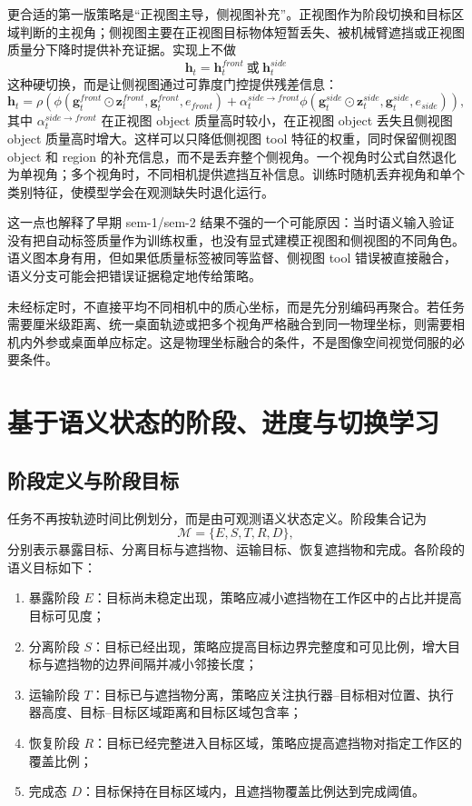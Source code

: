 \documentclass[UTF8,a4paper,11pt]{ctexart}
\begin{document}
更合适的第一版策略是“正视图主导，侧视图补充”。正视图作为阶段切换和目标区域判断的主视角；侧视图主要在正视图目标物体短暂丢失、被机械臂遮挡或正视图质量分下降时提供补充证据。实现上不做
\begin{equation}
\bm h_t=\bm h_t^{front}\ \text{或}\ \bm h_t^{side}
\end{equation}
这种硬切换，而是让侧视图通过可靠度门控提供残差信息：
\begin{equation}
\bm h_t=\rho\left(
\phi(\bm g_t^{front}\odot\bm z_t^{front},\bm g_t^{front},e_{front})
+\alpha_t^{side\rightarrow front}
\phi(\bm g_t^{side}\odot\bm z_t^{side},\bm g_t^{side},e_{side})
\right),
\end{equation}
其中 $\alpha_t^{side\rightarrow front}$ 在正视图 object 质量高时较小，在正视图 object 丢失且侧视图 object 质量高时增大。这样可以只降低侧视图 tool 特征的权重，同时保留侧视图 object 和 region 的补充信息，而不是丢弃整个侧视角。一个视角时公式自然退化为单视角；多个视角时，不同相机提供遮挡互补信息。训练时随机丢弃视角和单个类别特征，使模型学会在观测缺失时退化运行。

这一点也解释了早期 sem-1/sem-2 结果不强的一个可能原因：当时语义输入验证没有把自动标签质量作为训练权重，也没有显式建模正视图和侧视图的不同角色。语义图本身有用，但如果低质量标签被同等监督、侧视图 tool 错误被直接融合，语义分支可能会把错误证据稳定地传给策略。

未经标定时，不直接平均不同相机中的质心坐标，而是先分别编码再聚合。若任务需要厘米级距离、统一桌面轨迹或把多个视角严格融合到同一物理坐标，则需要相机内外参或桌面单应标定。这是物理坐标融合的条件，不是图像空间视觉伺服的必要条件。

\section{基于语义状态的阶段、进度与切换学习}

\subsection{阶段定义与阶段目标}

任务不再按轨迹时间比例划分，而是由可观测语义状态定义。阶段集合记为
\begin{equation}
\mathcal M=\{E,S,T,R,D\},
\end{equation}
分别表示暴露目标、分离目标与遮挡物、运输目标、恢复遮挡物和完成。各阶段的语义目标如下：
\begin{enumerate}[leftmargin=2.3em]
  \item 暴露阶段 $E$：目标尚未稳定出现，策略应减小遮挡物在工作区中的占比并提高目标可见度；
  \item 分离阶段 $S$：目标已经出现，策略应提高目标边界完整度和可见比例，增大目标与遮挡物的边界间隔并减小邻接长度；
  \item 运输阶段 $T$：目标已与遮挡物分离，策略应关注执行器--目标相对位置、执行器高度、目标--目标区域距离和目标区域包含率；
  \item 恢复阶段 $R$：目标已经完整进入目标区域，策略应提高遮挡物对指定工作区的覆盖比例；
  \item 完成态 $D$：目标保持在目标区域内，且遮挡物覆盖比例达到完成阈值。
\end{enumerate}
\end{document}
